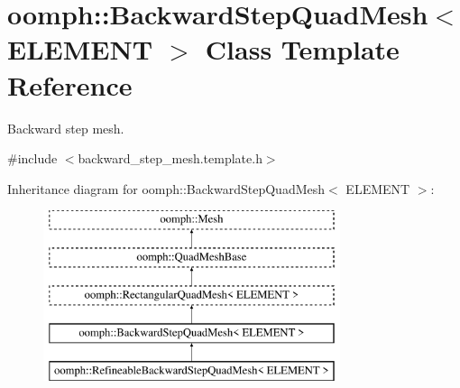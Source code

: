 \hypertarget{classoomph_1_1BackwardStepQuadMesh}{}\section{oomph\+:\+:Backward\+Step\+Quad\+Mesh$<$ E\+L\+E\+M\+E\+NT $>$ Class Template Reference}
\label{classoomph_1_1BackwardStepQuadMesh}


Backward step mesh.  




{\ttfamily \#include $<$backward\+\_\+step\+\_\+mesh.\+template.\+h$>$}

Inheritance diagram for oomph\+:\+:Backward\+Step\+Quad\+Mesh$<$ E\+L\+E\+M\+E\+NT $>$\+:\begin{figure}[H]
\begin{center}
\leavevmode
\includegraphics[height=5.000000cm]{classoomph_1_1BackwardStepQuadMesh}
\end{center}
\end{figure}
